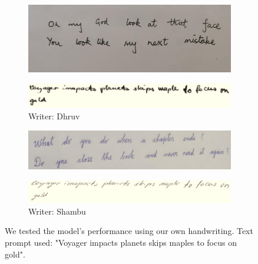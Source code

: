 \documentclass[10pt,twocolumn,letterpaper]{article}
\begin{document}
\begin{figure}[h]
  \begin{subfigure}[b]{0.45\textwidth}
    \includegraphics[width=\textwidth]{../latex-src/Images/dhruv-1.jpeg}
    \label{fig:dhruv-input}
  \end{subfigure}
  \hfill
  \vspace*{-3mm}
  \begin{subfigure}[b]{0.45\textwidth}
    \includegraphics[width=\textwidth]{../latex-src/Images/Dhruv-output.png}
    \caption{{Writer: Dhruv}}
    \label{fig:dhruv-output}
  \end{subfigure}
  \hfill
  \vspace*{3mm}

  \begin{subfigure}[b]{0.45\textwidth}
    \includegraphics[width=\textwidth]{../latex-src/Images/shambu-1.jpeg}
    \label{fig:shambu-input}
  \end{subfigure}
  \hfill
  \vspace*{-3mm}
  \begin{subfigure}[b]{0.45\textwidth}
    \includegraphics[width=\textwidth]{../latex-src/Images/Shambu-output.png}
    \caption{{Writer: Shambu}}
    \label{fig:shambu-output}
  \end{subfigure}
  \caption{{We tested the model's performance using our own handwriting. Text prompt used: "Voyager impacts planets skips maples to focus on gold".}}
  \label{fig:Writers}
\end{figure}
\end{document}
